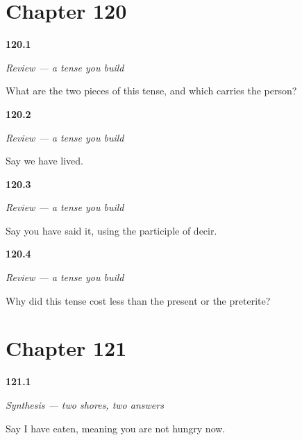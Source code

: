 \section*{Chapter 120}

\noindent\begin{minipage}[t]{\linewidth}
\raggedright
\hypertarget{review-ES-C49-repaso-perfecto-pieces}{\textbf{120.1}} \emph{Review — a tense you build}\par
\small What are the two pieces of this tense, and which carries the person?
\end{minipage}\par\medskip

\noindent\begin{minipage}[t]{\linewidth}
\raggedright
\hypertarget{review-ES-C49-repaso-perfecto-build}{\textbf{120.2}} \emph{Review — a tense you build}\par
\small Say we have lived.
\end{minipage}\par\medskip

\noindent\begin{minipage}[t]{\linewidth}
\raggedright
\hypertarget{review-ES-C49-repaso-perfecto-irreg}{\textbf{120.3}} \emph{Review — a tense you build}\par
\small Say you have said it, using the participle of decir.
\end{minipage}\par\medskip

\noindent\begin{minipage}[t]{\linewidth}
\raggedright
\hypertarget{review-ES-C49-repaso-perfecto-cost}{\textbf{120.4}} \emph{Review — a tense you build}\par
\small Why did this tense cost less than the present or the preterite?
\end{minipage}\par\medskip

\section*{Chapter 121}

\noindent\begin{minipage}[t]{\linewidth}
\raggedright
\hypertarget{review-ES-C49-sintesis-dos-orillas-now}{\textbf{121.1}} \emph{Synthesis — two shores, two answers}\par
\small Say I have eaten, meaning you are not hungry now.
\end{minipage}\par\medskip

